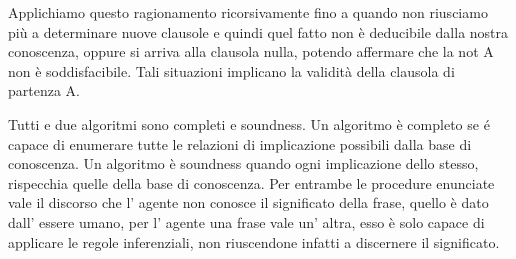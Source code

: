 		Applichiamo questo ragionamento ricorsivamente fino a quando non riusciamo più a determinare nuove clausole e quindi quel fatto non è deducibile dalla nostra conoscenza, oppure si arriva alla clausola nulla, potendo affermare che la not A non è soddisfacibile.
		Tali situazioni implicano la validità della clausola di partenza A.
		\par
		Tutti e due algoritmi sono completi e soundness.
		Un algoritmo è completo se é capace di enumerare tutte le relazioni di implicazione possibili dalla base di conoscenza.
		Un algoritmo è soundness quando ogni implicazione dello stesso, rispecchia quelle della base di conoscenza.
		Per entrambe le procedure enunciate vale il discorso che l' agente non conosce il significato della frase, quello è dato dall' essere umano, per l' agente una frase vale un' altra, esso è solo capace di applicare le regole inferenziali, non riuscendone infatti a discernere il significato.
		
